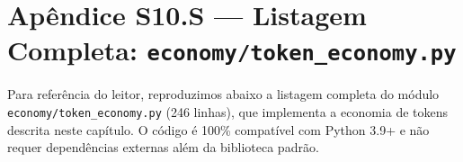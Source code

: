 
\section*{Apêndice S10.S --- Listagem Completa: \texttt{economy/token\_economy.py}}

Para referência do leitor, reproduzimos abaixo a listagem completa do módulo \texttt{economy/token\_economy.py} (246 linhas), que implementa a economia de tokens descrita neste capítulo. O código é 100\% compatível com Python 3.9+ e não requer dependências externas além da biblioteca padrão.

